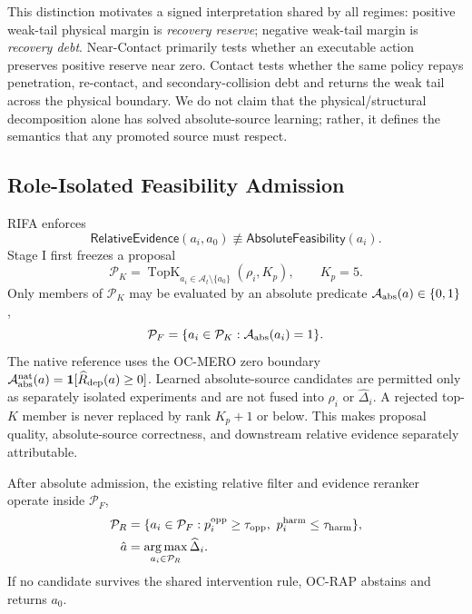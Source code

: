 \documentclass[conference]{IEEEtran}
\DeclareMathOperator*{\argmax}{arg\,max}
\DeclareMathOperator{\TopK}{TopK}
\begin{document}
This distinction motivates a signed interpretation shared by all regimes: positive weak-tail physical margin is \emph{recovery reserve}; negative weak-tail margin is \emph{recovery debt}. Near-Contact primarily tests whether an executable action preserves positive reserve near zero. Contact tests whether the same policy repays penetration, re-contact, and secondary-collision debt and returns the weak tail across the physical boundary. We do not claim that the physical/structural decomposition alone has solved absolute-source learning; rather, it defines the semantics that any promoted source must respect.

\subsection{Role-Isolated Feasibility Admission}
\label{subsec:rifa}
RIFA enforces
\begin{equation}
 \mathsf{RelativeEvidence}(a_i,a_0)\not\equiv\mathsf{AbsoluteFeasibility}(a_i).
 \label{eq:role_separation}
\end{equation}
Stage I first freezes a proposal
\begin{equation}
 \mathcal{P}_K=\TopK_{a_i\in\mathcal{A}_t\setminus\{a_0\}}(\rho_i,K_p),\qquad K_p=5.
 \label{eq:topk}
\end{equation}
Only members of $\mathcal{P}_K$ may be evaluated by an absolute predicate $\mathcal{A}_{\rm abs}(a)\in\{0,1\}$,
\begin{equation}
 \mathcal{P}_F=\{a_i\in\mathcal{P}_K:\mathcal{A}_{\rm abs}(a_i)=1\}.
 \label{eq:feasible_proposal}
\end{equation}
The native reference uses the OC-MERO zero boundary $\mathcal{A}_{\rm abs}^{\rm nat}(a)=\mathbf{1}[\widehat R_{\rm dep}(a)\ge0]$. Learned absolute-source candidates are permitted only as separately isolated experiments and are not fused into $\rho_i$ or $\widehat\Delta_i$. A rejected top-$K$ member is never replaced by rank $K_p+1$ or below. This makes proposal quality, absolute-source correctness, and downstream relative evidence separately attributable.

After absolute admission, the existing relative filter and evidence reranker operate inside $\mathcal{P}_F$,
\begin{align}
 \mathcal{P}_R&=\{a_i\in\mathcal{P}_F:p_i^{\rm opp}\ge\tau_{\rm opp},\ p_i^{\rm harm}\le\tau_{\rm harm}\},\\
 \hat a&=\argmax_{a_i\in\mathcal{P}_R}\widehat\Delta_i.
 \label{eq:relative_filter}
\end{align}
If no candidate survives the shared intervention rule, OC-RAP abstains and returns $a_0$.
\end{document}
